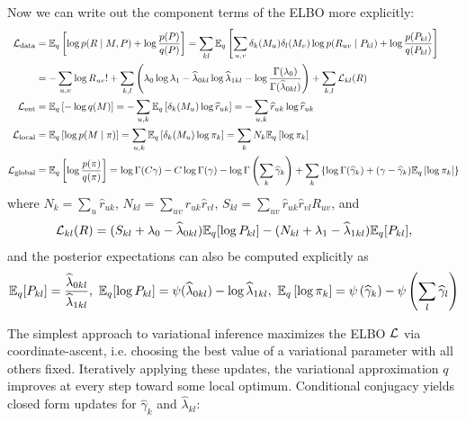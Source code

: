 \documentclass{article}
\begin{document}
 Now we can write out the component terms of the ELBO more explicitly:
\begin{equation*}
\begin{split}
\mathcal{L}_{\text{data}}
&= \mathbb{E}_q\left[\log p(R\mid M,P)+ \log\frac{p(P)}{q(P)}\right]
= \sum_{kl}\mathbb{E}_q\left[\sum_{u,v}\delta_{k}(M_u)\delta_l(M_v)\log p(R_{uv}\mid P_{kl})+ \log\frac{p(P_{kl})}{q(P_{kl})}\right] \\
&= -\sum_{u,v}\log R_{uv}! + \sum_{k,l} \left(\lambda_{0}\log\lambda_1-\widehat\lambda_{0kl}\log\widehat\lambda_{1kl} - \log\frac{\Gamma(\lambda_0)}{\Gamma(\widehat\lambda_{0kl})}\right) + \sum_{k,l} \mathcal{L}_{kl}(R)
~\\
\mathcal{L}_{\text{ent}}
&= \mathbb{E}_q\left[-\log q(M)\right]
= -\sum_{u,k}\mathbb{E}_q\left[\delta_{k}(M_u)\log \widehat r_{uk}\right]
= -\sum_{u,k}\widehat r_{uk}\log \widehat r_{uk}
~\\
\mathcal{L}_{\text{local}}
&= \mathbb{E}_q\left[\log p(M\mid \pi)\right]
= \sum_{u,k}\mathbb{E}_q\left[\delta_{k}(M_u)\log \pi_k\right]
= \sum_{k}N_k\mathbb{E}_q\left[\log \pi_k\right]
~\\
\mathcal{L}_{\text{global}}
&= \mathbb{E}_q\left[\log\frac{p(\pi)}{q(\pi)}\right]
= \log \Gamma(C\gamma) - C\log\Gamma(\gamma) -\log \Gamma\left(\sum_k\widehat\gamma_k\right) + \sum_k\left\{\log\Gamma(\widehat\gamma_k)+ (\gamma-\widehat\gamma_k)\mathbb{E}_q\left[\log \pi_k\right]\right\}
\end{split}
\end{equation*}
where $N_k = \sum_{u}\widehat r_{uk}$, $N_{kl} = \sum_{uv}\widehat r_{uk}\widehat r_{vl}$, $S_{kl} = \sum_{uv}\widehat r_{uk}\widehat r_{vl} R_{uv}$, and 
$$
\mathcal{L}_{kl}(R) 
= (S_{kl} + \lambda_{0} - \widehat\lambda_{0kl}) \mathbb{E}_q[\log P_{kl}]
   -(N_{kl} + \lambda_{1} - \widehat\lambda_{1kl}) \mathbb{E}_q[P_{kl}], 
$$
and the posterior expectations can also be computed explicitly as 
$$
\mathbb{E}_q[P_{kl}] =  \frac{\widehat\lambda_{0kl}}{\widehat\lambda_{1kl}}, ~
\mathbb{E}_q[\log P_{kl}] = \psi(\widehat\lambda_{0kl}) - \log \widehat\lambda_{1kl}, ~
\mathbb{E}_q\left[\log \pi_k\right] = \psi\left(\widehat\gamma_k\right) - \psi\left(\sum_l\widehat\gamma_l\right)
$$

 The simplest approach to variational inference maximizes the ELBO $\mathcal{L}$ via coordinate-ascent, i.e. choosing the best value of a variational parameter with all others fixed. Iteratively applying these updates, the variational approximation $q$ improves at every step toward some local optimum. Conditional conjugacy yields closed form updates for $\widehat\gamma_k$ and $\widehat\lambda_{kl}$:
\end{document}
